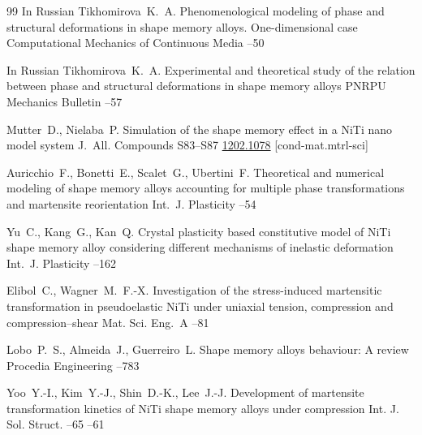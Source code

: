 \begin{thebibliography}{99}
\lang In Russian
\by Tikhomirova~K.~A.
\paper Phenomenological modeling of phase and structural deformations in shape memory alloys. One-dimensional case \jour Computational Mechanics of Continuous Media
--50


\lang In Russian
\by Tikhomirova~K.~A.
\paper Experimental and theoretical study of the relation between phase and structural deformations in shape memory alloys
\jour PNRPU Mechanics Bulletin
--57



\by Mutter~D., Nielaba~P.
\paper Simulation of the shape memory effect in a NiTi nano model system
\jour J.~All. Compounds
\issue 
\pages S83--S87
\arxiv  	\href{https://arxiv.org/abs/1202.1078}{1202.1078} [cond-mat.mtrl-sci]

\by Auricchio~F., Bonetti~E., Scalet~G., Ubertini~F.
\paper Theoretical and numerical modeling of shape memory alloys accounting for multiple phase transformations and martensite reorientation
\jour Int.~J. Plasticity
--54

\by Yu~C., Kang~G., Kan~Q.
\paper Crystal plasticity based constitutive model of NiTi shape memory alloy considering different mechanisms of inelastic deformation
\jour Int.~J. Plasticity
--162

\by Elibol~C., Wagner~M.~F.-X.
\paper Investigation of the stress-induced martensitic transformation in pseudoelastic NiTi under uniaxial tension, compression and compression–shear
\jour Mat. Sci. Eng.~A
--81

\by Lobo~P.~S., Almeida~J., Guerreiro~L.
\paper Shape memory alloys behaviour: A review
\jour Procedia Engineering
--783

\by Yoo~Y.-I., Kim~Y.-J., Shin~D.-K., Lee~J.-J.
\paper Development of martensite transformation kinetics of NiTi shape memory alloys under compression
\jour Int. J. Sol. Struct.
--65
--61


\end{thebibliography}
